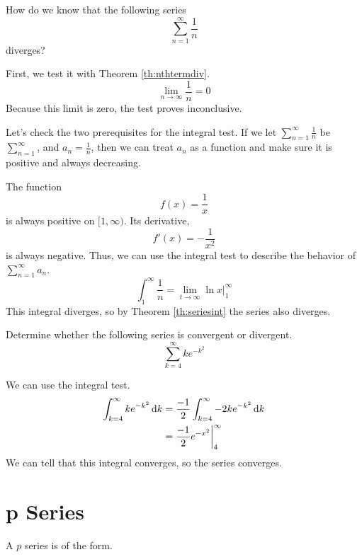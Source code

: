 \begin{ex}\label{famousp}
  How do we know that the following series
  \[ \sum^\infty_{n=1} \frac{1}{n} \]
  diverges?
  \begin{sol}
    First, we test it with Theorem \ref{th:nthtermdiv}.
    \[ \lim_{n\to\infty} \frac{1}{n}=0\]
    Because this limit is zero, the test proves inconclusive.

    Let's check the two prerequisites for the integral test. If we let
    $\sum^\infty_{n=1} \frac{1}{n}$ be $\sum^\infty_{n=1}$, and $a_n =
    \frac{1}{n}$, then we can treat $a_n$ as a function and make sure it is
    positive and always decreasing.

    The function \[ f(x)=\frac{1}{x} \]is always positive on $[1, \infty)$.
    Its derivative, \[f'(x)=-\frac{1}{x^2}\] is always negative. Thus, we can
    use the integral test to describe the behavior of $\sum^\infty_{n=1} a_n$.
    \[
      \int^\infty_1 \frac{1}{n} = \lim_{t\to\infty} \ln x |^\infty_1
    \]
    This integral diverges, so by Theorem \ref{th:seriesint} the series also
    diverges.
  \end{sol}
\end{ex}
\begin{ex}
  Determine whether the following series is convergent or divergent.
  \[ \sum_{k=4}^\infty k e^{-k^2} \]
  \begin{sol}
    We can use the integral test.
    \begin{align*}
      \int_{k=4}^\infty k e^{-k^2} \,\mathrm{d} k
      &=\frac{-1}{2}\int_{k=4}^\infty -2 k e^{-k^2} \,\mathrm{d} k \\
      &=\frac{-1}{2}e^{-x^2} \bigg|_4^\infty
    \end{align*}
    We can tell that this integral converges, so the series converges.
  \end{sol}
\end{ex}


\section{p Series}

A \(p\) series is of the form.

